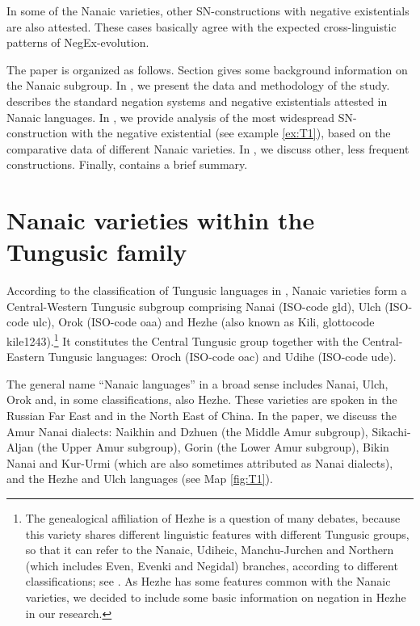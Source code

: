 \documentclass[output=paper,colorlinks,citecolor=brown]{langscibook}
\begin{document}
In some of the Nanaic varieties, other SN-constructions with negative existentials are also attested. These cases basically agree with the expected cross-linguistic patterns of NegEx-evolution.

The paper is organized as follows. Section  gives some background information on the Nanaic subgroup. In , we present the data and methodology of the study.  describes the standard negation systems and negative existentials attested in Nanaic languages. In , we provide analysis of the most widespread SN-construction with the negative existential (see example \ref{ex:T1}), based on the comparative data of different Nanaic varieties. In , we discuss other, less frequent constructions. Finally,  contains a brief summary.

\section{Nanaic varieties within the Tungusic family}\label{sec:T2}

According to the classification of Tungusic languages in \citet{doerfer1978a}, Nanaic varieties form a Central-Western Tungusic subgroup comprising Nanai (ISO-code gld), Ulch (ISO-code ulc), Orok (ISO-code oaa) and Hezhe (also known as Kili, glottocode kile1243).\footnote{The genealogical affiliation of Hezhe is a question of many debates, because this variety shares different linguistic features with different Tungusic groups, so that it can refer to the Nanaic, Udiheic, Manchu-Jurchen and Northern (which includes Even, Evenki and Negidal) branches, according to different classifications; see \citet{hoelzl2017a}. As Hezhe has some features common with the Nanaic varieties, we decided to include some basic information on negation in Hezhe in our research.} It constitutes the Central Tungusic group together with the Central-Eastern Tungusic languages: Oroch (ISO-code oac) and Udihe (ISO-code ude).

The general name “Nanaic languages” in a broad sense includes Nanai, Ulch, Orok and, in some classifications, also Hezhe. These varieties are spoken in the Russian Far East and in the North East of China. In the paper, we discuss the Amur Nanai dialects: Naikhin and Dzhuen (the Middle Amur subgroup), Sikachi-Aljan (the Upper Amur subgroup), Gorin (the Lower Amur subgroup), Bikin Nanai and Kur-Urmi (which are also sometimes attributed as Nanai dialects), and the Hezhe and Ulch languages (see Map \ref{fig:T1}).
\end{document}
